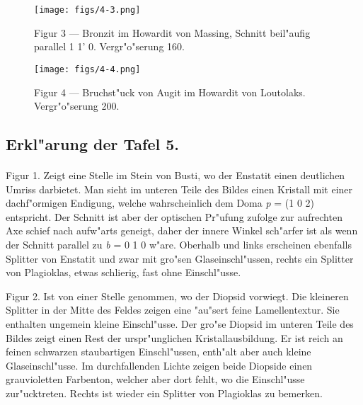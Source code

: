 \documentclass[a4paper, 11pt, oneside, polutonikogreek, german]{article}
\begin{document}
\vspace*{\fill}
\begin{figure}[H]
\centering
\texttt{[image: figs/4-3.png]}
\caption{\small Figur 3 --- Bronzit im Howardit von Massing, Schnitt beil"aufig parallel 1 1' 0. Vergr"o"serung 160.}
\end{figure}
\vspace*{\fill}
\clearpage

\vspace*{\fill}
\begin{figure}[H]
\centering
\texttt{[image: figs/4-4.png]}
\caption{\small Figur 4 --- Bruchst"uck von Augit im Howardit von Loutolaks. Vergr"o"serung 200.}
\end{figure}
\vspace*{\fill}
\clearpage

\subsection{Erkl"arung der Tafel 5.}
\paragraph{}
Figur 1. Zeigt eine Stelle im Stein von Busti, wo der Enstatit einen deutlichen Umriss darbietet. Man sieht im unteren Teile des Bildes einen Kristall mit einer dachf"ormigen Endigung, welche wahrscheinlich dem Doma \emph{p} = (1 0 2) entspricht. Der Schnitt ist aber der optischen Pr"ufung zufolge zur aufrechten Axe schief nach aufw"arts geneigt, daher der innere Winkel sch"arfer ist als wenn der Schnitt parallel zu \emph{b} = 0 1 0 w"are. Oberhalb und links erscheinen ebenfalls Splitter von Enstatit und zwar mit gro"sen Glaseinschl"ussen, rechts ein Splitter von Plagioklas, etwas schlierig, fast ohne Einschl"usse.

Figur 2. Ist von einer Stelle genommen, wo der Diopsid vorwiegt. Die kleineren Splitter in der Mitte des Feldes zeigen eine "au"sert feine Lamellentextur. Sie enthalten ungemein kleine Einschl"usse. Der gro"se Diopsid im unteren Teile des Bildes zeigt einen Rest der urspr"unglichen Kristallausbildung. Er ist reich an feinen schwarzen staubartigen Einschl"ussen, enth"alt aber auch kleine Glaseinschl"usse. Im durchfallenden Lichte zeigen beide Diopside einen grauvioletten Farbenton, welcher aber dort fehlt, wo die Einschl"usse zur"ucktreten. Rechts ist wieder ein Splitter von Plagioklas zu bemerken.
\end{document}

